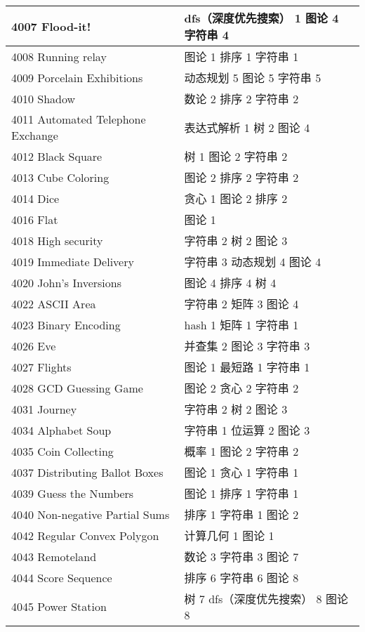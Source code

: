 \begin{longtable}{| p{} | p{} |}
 4007 Flood-it!  & dfs（深度优先搜索） 1 图论 4 字符串 4 \\ \hline
 4008 Running relay  & 图论 1 排序 1 字符串 1 \\ \hline
 4009 Porcelain Exhibitions  & 动态规划 5 图论 5 字符串 5 \\ \hline
 4010 Shadow  & 数论 2 排序 2 字符串 2 \\ \hline
 4011 Automated Telephone Exchange  & 表达式解析 1 树 2 图论 4 \\ \hline
 4012 Black Square  & 树 1 图论 2 字符串 2 \\ \hline
 4013 Cube Coloring  & 图论 2 排序 2 字符串 2 \\ \hline
 4014 Dice  & 贪心 1 图论 2 排序 2 \\ \hline
 4016 Flat  & 图论 1 \\ \hline
 4018 High security  & 字符串 2 树 2 图论 3 \\ \hline
 4019 Immediate Delivery  & 字符串 3 动态规划 4 图论 4 \\ \hline
 4020 John's Inversions  & 图论 4 排序 4 树 4 \\ \hline
 4022 ASCII Area  & 字符串 2 矩阵 3 图论 4 \\ \hline
 4023 Binary Encoding  & hash 1 矩阵 1 字符串 1 \\ \hline
 4026 Eve  & 并查集 2 图论 3 字符串 3 \\ \hline
 4027 Flights  & 图论 1 最短路 1 字符串 1 \\ \hline
 4028 GCD Guessing Game  & 图论 2 贪心 2 字符串 2 \\ \hline
 4031 Journey  & 字符串 2 树 2 图论 3 \\ \hline
 4034 Alphabet Soup  & 字符串 1 位运算 2 图论 3 \\ \hline
 4035 Coin Collecting  & 概率 1 图论 2 字符串 2 \\ \hline
 4037 Distributing Ballot Boxes  & 图论 1 贪心 1 字符串 1 \\ \hline
 4039 Guess the Numbers  & 图论 1 排序 1 字符串 1 \\ \hline
 4040 Non-negative Partial Sums  & 排序 1 字符串 1 图论 2 \\ \hline
 4042 Regular Convex Polygon  & 计算几何 1 图论 1 \\ \hline
 4043 Remoteland  & 数论 3 字符串 3 图论 7 \\ \hline
 4044 Score Sequence  & 排序 6 字符串 6 图论 8 \\ \hline
 4045 Power Station  & 树 7 dfs（深度优先搜索） 8 图论 8 \\ \hline

\end{longtable}
